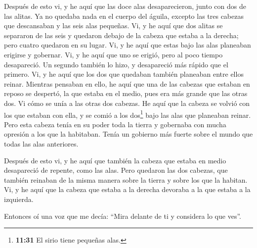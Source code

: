  Después de esto vi, y he aquí que las doce alas
desaparecieron, junto con dos de las alitas.  Ya no
quedaba nada en el cuerpo del águila, excepto las tres cabezas que
descansaban y las seis alas pequeñas.  Vi, y he aquí que
dos alitas se separaron de las seis y quedaron debajo de la cabeza que
estaba a la derecha; pero cuatro quedaron en su lugar. 
Vi, y he aquí que estas bajo las alas planeaban erigirse y gobernar.
 Vi, y he aquí que uno se erigió, pero al poco tiempo
desapareció.  Un segundo también lo hizo, y desapareció
más rápido que el primero.  Vi, y he aquí que los dos que
quedaban también planeaban entre ellos reinar.  Mientras
pensaban en ello, he aquí que una de las cabezas que estaban en reposo
se despertó, la que estaba en el medio, pues era más grande que las
otras dos.  Vi cómo se unía a las otras dos cabezas.
 He aquí que la cabeza se volvió con los que estaban con
ella, y se comió a los dos\footnote{\textbf{11:31} El sirio tiene
  pequeñas alas.} bajo las alas que planeaban reinar. 
Pero esta cabeza tenía en su poder toda la tierra y gobernaba con mucha
opresión a los que la habitaban. Tenía un gobierno más fuerte sobre el
mundo que todas las alas anteriores.

 Después de esto vi, y he aquí que también la cabeza que
estaba en medio desapareció de repente, como las alas. 
Pero quedaron las dos cabezas, que también reinaban de la misma manera
sobre la tierra y sobre los que la habitan.  Vi, y he
aquí que la cabeza que estaba a la derecha devoraba a la que estaba a la
izquierda.

 Entonces oí una voz que me decía: ``Mira delante de ti y
considera lo que ves''.

